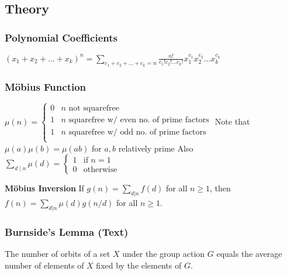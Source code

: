\documentclass[12pt]{extarticle}
\author{
	Ayush Ranjan, Naman Jain, Manish Tanwar
}
\begin{document}
\maketitle
		\begin{multicols*}{2}
			
			\setlength{\parskip}{0.0in}
			\tableofcontents
			\setlength{\parskip}{0.0in}
			
			
			\section{Theory}
			
			\subsubsection*{Polynomial Coefficients} %
			$(x_1 + x_2 + ... + x_k)^n = \sum_{c_1 + c_2 + ... + c_k = n}
			\frac{n!}{c_1! c_2! ... c_k!} x_1^{c_1} x_2^{c_2} ... x_k^{c_k}$
			
			\subsubsection*{M\"obius Function} %
			$\mu(n) = \begin{cases}
			0 & \text{$n$ not squarefree} \\
			1 & \text{$n$ squarefree w/ even no. of prime factors} \\
			1 & \text{$n$ squarefree w/ odd no. of prime factors} \\
			\end{cases}$
			Note that $\mu(a) \mu(b) = \mu(ab)$ for $a, b$ relatively prime
			Also $\sum_{d \mid n} \mu(d) = \begin{cases} 1 & \text{if $n = 1$} \\
			0 & \text{otherwise} \end{cases}$
			
			\textbf{M\"obius Inversion}
			If $g(n) = \sum_{d|n} f(d)$ for all $n \ge 1$, then
			$f(n) = \sum_{d|n} \mu(d)g(n/d)$ for all $n \ge 1$.
			
			
			\subsubsection*{Burnside's Lemma (Text)} %
			The number of orbits of a set $X$ under the group action $G$ equals the average
			number of elements of $X$ fixed by the elements of $G$.
			

\end{multicols*}
\end{document}

